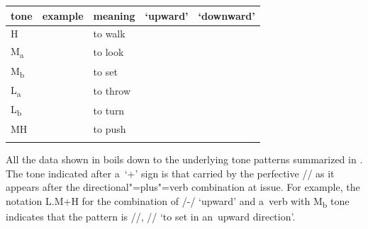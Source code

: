 \begin{subtables}
\begin{table}
\begin{tabularx}{\textwidth}{ l@{\hspace{7mm}} l@{\hspace{7mm}} l@{\hspace{7mm}} Q Q }
			\lsptoprule
			tone & example & meaning & ‘upward’  &  ‘downward’\\ \midrule
			H &  & to walk &  & \\
			M\textsubscript{a} &  & to look &  & \\
			M\textsubscript{b} &  & to set &  & \\
			L\textsubscript{a} &  & to throw &  & \\
			L\textsubscript{b} &  & to turn &  & \\
			MH &  & to push &  & \\
			\lspbottomrule
		\end{tabularx}
	\end{table}

\end{subtables}

 
All the data shown in  boils down to the underlying tone patterns summarized in . The tone indicated after a~‘+’ sign is that carried by the
{perfective} \mbox{//} as it appears after the directional"=plus"=verb combination at issue. For example, the notation L.M+H for
the combination of /-/ ‘upward’ and a~verb with M\textsubscript{b} tone indicates that the pattern is
//, // ‘to set in an~upward direction’. 

